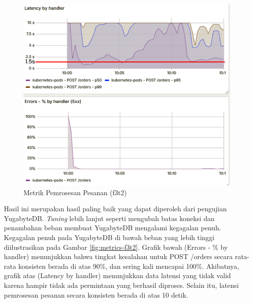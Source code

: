 \begin{figure}[H]
    \centering
    \includegraphics[width=1\textwidth]{resources/chapter-4/latensi-yugabyte-success.png}
    \caption{Metrik Pemrosesan Pesanan (f3t2)}
    \label{fig:metrics-f3t1}
\end{figure}

Hasil ini merupakan hasil paling baik yang dapat diperoleh dari pengujian YugabyteDB. \textit{Tuning} lebih lanjut seperti mengubah batas koneksi dan penambahan beban membuat YugabyteDB mengalami kegagalan penuh. Kegagalan penuh pada YugabyteDB di bawah beban yang lebih tinggi diilustrasikan pada Gambar \ref{fig:metrics-f3t2}. Grafik bawah (Errors - \% by handler) menunjukkan bahwa tingkat kesalahan untuk POST /orders secara rata-rata konsisten berada di atas 90\%, dan sering kali mencapai 100\%. Akibatnya, grafik atas (Latency by handler) menunjukkan data latensi yang tidak valid karena hampir tidak ada permintaan yang berhasil diproses. Selain itu, latensi pemrosesan pesanan secara konsisten berada di atas 10 detik.

